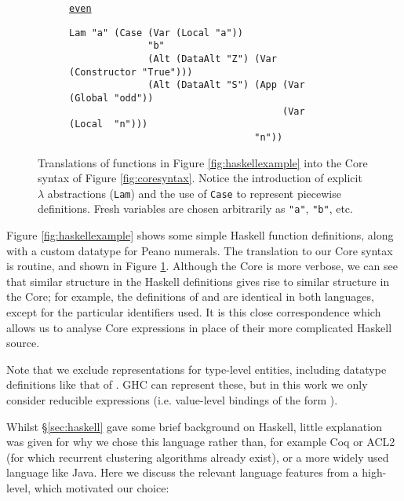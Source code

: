 \begin{figure}
\begin{subfigure}[even]{\textwidth}
    \begin{small}
      \underline{\texttt{even}}
      \begin{verbatim}
Lam "a" (Case (Var (Local "a"))
              "b"
              (Alt (DataAlt "Z") (Var (Constructor "True")))
              (Alt (DataAlt "S") (App (Var (Global "odd"))
                                      (Var (Local  "n")))
                                 "n"))
      \end{verbatim}
    \end{small}
  \end{subfigure}
  \caption{Translations of functions in Figure \ref{fig:haskellexample} into the
    Core syntax of Figure \ref{fig:coresyntax}. Notice the introduction of
    explicit $\lambda$ abstractions (\texttt{Lam}) and the use of \texttt{Case}
    to represent piecewise definitions. Fresh variables are chosen arbitrarily
    as \texttt{"a"}, \texttt{"b"}, etc.}
  \label{fig:coreexample}
\end{figure}

Figure \ref{fig:haskellexample} shows some simple Haskell function definitions,
along with a custom datatype for Peano numerals. The translation to our Core
syntax is routine, and shown in Figure \ref{fig:coreexample}. Although the Core
is more verbose, we can see that similar structure in the Haskell definitions
gives rise to similar structure in the Core; for example, the definitions of
 and  are identical in both languages, except for the
particular identifiers used. It is this close correspondence which allows us to
analyse Core expressions in place of their more complicated Haskell source.

Note that we exclude representations for type-level entities, including datatype
definitions like that of . GHC can represent these, but in this work we
only consider reducible expressions (i.e. value-level bindings of the form
\mbox{}).


Whilst \S \ref{sec:haskell} gave some brief background on Haskell, little
explanation was given for why we chose this language rather than, for example
Coq or ACL2 (for which recurrent clustering algorithms already exist), or a more
widely used language like Java. Here we discuss the relevant language features
from a high-level, which motivated our choice:

